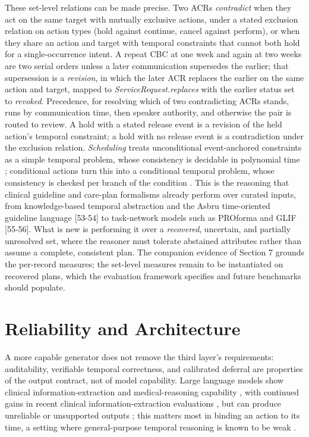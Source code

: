 These set-level relations can be made precise. Two ACRs \emph{contradict} when they act on the same target with mutually exclusive actions, under a stated exclusion relation on action types (hold against continue, cancel against perform), or when they share an action and target with temporal constraints that cannot both hold for a single-occurrence intent. A repeat CBC at one week and again at two weeks are two serial orders unless a later communication supersedes the earlier; that supersession is a \emph{revision}, in which the later ACR replaces the earlier on the same action and target, mapped to \emph{ServiceRequest.replaces} with the earlier status set to \emph{revoked}. Precedence, for resolving which of two contradicting ACRs stands, runs by communication time, then speaker authority, and otherwise the pair is routed to review. A hold with a stated release event is a revision of the held action's temporal constraint; a hold with no release event is a contradiction under the exclusion relation. \emph{Scheduling} treats unconditional event-anchored constraints as a simple temporal problem, whose consistency is decidable in polynomial time \cite{ref51}; conditional actions turn this into a conditional temporal problem, whose consistency is checked per branch of the condition \cite{ref52}. This is the reasoning that clinical guideline and care-plan formalisms already perform over curated inputs, from knowledge-based temporal abstraction and the Asbru time-oriented guideline language {[}53-54{]} to task-network models such as PROforma and GLIF {[}55-56{]}. What is new is performing it over a \emph{recovered}, uncertain, and partially unresolved set, where the reasoner must tolerate abstained attributes rather than assume a complete, consistent plan. The companion evidence of Section 7 grounds the per-record measures; the set-level measures remain to be instantiated on recovered plans, which the evaluation framework specifies and future benchmarks should populate.

\section{Reliability and Architecture}\label{reliability-and-architecture}

A more capable generator does not remove the third layer's requirements: auditability, verifiable temporal correctness, and calibrated deferral are properties of the output contract, not of model capability. Large language models show clinical information-extraction and medical-reasoning capability \cite{ref38, ref57}, with continued gains in recent clinical information-extraction evaluations \cite{ref58}, but can produce unreliable or unsupported outputs \cite{ref59}; this matters most in binding an action to its time, a setting where general-purpose temporal reasoning is known to be weak \cite{ref48}.

